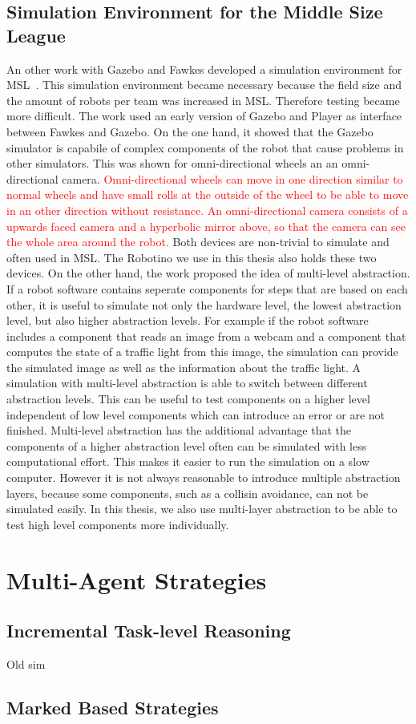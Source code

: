 \subsection{Simulation Environment for the Middle Size League}
An other work with Gazebo and Fawkes developed a simulation environment for MSL~\cite{MultiLevelAbstraction}. This simulation environment became necessary because the field size and the amount of robots per team was increased in MSL. Therefore testing became more difficult. The work used an early version of Gazebo and Player as interface between Fawkes and Gazebo. On the one hand, it showed that the Gazebo simulator is capabile of complex components of the robot that cause problems in other simulators. This was shown for omni-directional wheels an an omni-directional camera. \textcolor{red}{Omni-directional wheels can move in one direction similar to normal wheels and have small rolls at the outside of the wheel to be able to move in an other direction without resistance. An omni-directional camera consists of a upwards faced camera and a hyperbolic mirror above, so that the camera can see the whole area around the robot.} Both devices are non-trivial to simulate and often used in MSL. The Robotino we use in this thesis also holds these two devices. On the other hand, the work proposed the idea of multi-level abstraction. If a robot software contains seperate components for steps that are based on each other, it is useful to simulate not only the hardware level, the lowest abstraction level, but also higher abstraction levels. For example if the robot software includes a component that reads an image from a webcam and a component that computes the state of a traffic light from this image, the simulation can provide the simulated image as well as the information about the traffic light. A simulation with multi-level abstraction is able to switch between different abstraction levels. This can be useful to test components on a higher level independent of low level components which can introduce an error or are not finished. Multi-level abstraction has the additional advantage that the components of a higher abstraction level often can be simulated with less computational effort. This makes it easier to run the simulation on a slow computer. However it is not always reasonable to introduce multiple abstraction layers, because some components, such as a collisin avoidance, can not be simulated easily. In this thesis, we also use multi-layer abstraction to be able to test high level components more individually.


\section{Multi-Agent Strategies}
\subsection{Incremental Task-level Reasoning}
Old sim
\subsection{Marked Based Strategies}
